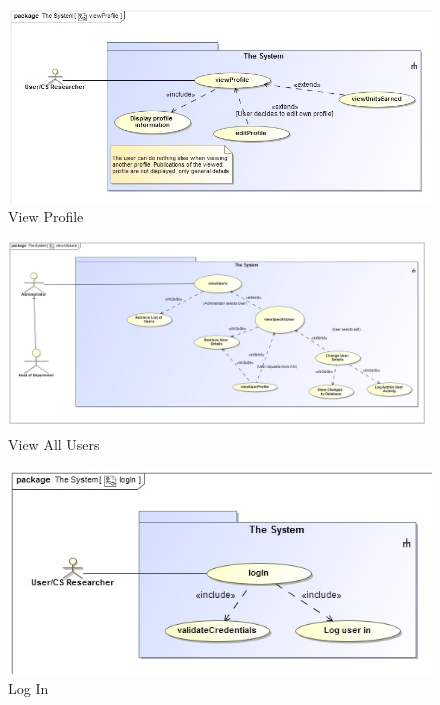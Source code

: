 \documentclass[a4paper,12pt]{article}
\begin{document}
\begin{figure}[H]
    \centering
    \caption{View Profile}
    \includegraphics[width=1\textwidth]{req-func/uc__The_System__viewProfile.jpg}
\end{figure}

\begin{figure}[H]
    \centering
    \caption{View All Users}
    \includegraphics[width=1\textwidth]{req-func/uc__The_System__viewAllUsers.jpg}
\end{figure}

\begin{figure}[H]
    \centering
    \caption{Log In}
    \includegraphics[width=1\textwidth]{req-func/uc__The_System__logIn.jpg}
\end{figure}
\end{document}
